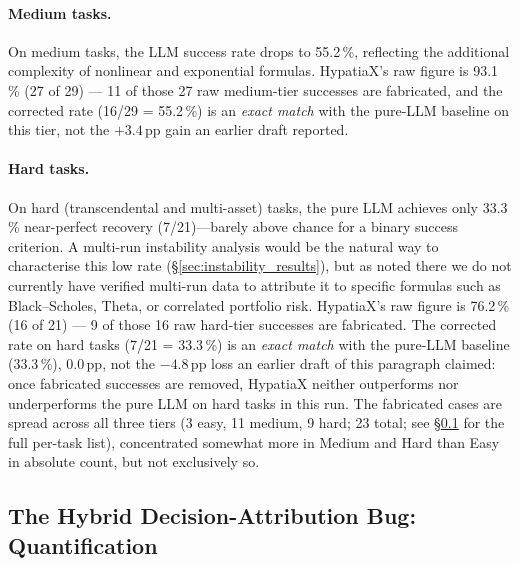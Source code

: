 \documentclass[twoside,11pt]{article}
\begin{document}
\paragraph{Medium tasks.}
On medium tasks, the LLM success rate drops to 55.2\,\%, reflecting the additional
complexity of nonlinear and exponential formulas. HypatiaX's raw figure is 93.1\,\%
(27 of 29) --- 11 of those 27 raw medium-tier successes are fabricated, and the
corrected rate (16/29 = 55.2\,\%) is an \emph{exact match} with the pure-LLM
baseline on this tier, not the $+3.4$\,pp gain an earlier draft reported.

\paragraph{Hard tasks.}
On hard (transcendental and multi-asset) tasks, the pure LLM achieves only 33.3\,\%
near-perfect recovery (7/21)---barely above chance for a binary success criterion. A
multi-run instability analysis would be the natural way to characterise this low
rate (\S\ref{sec:instability_results}), but as noted there we do not currently
have verified multi-run data to attribute it to specific formulas such as
Black--Scholes, Theta, or correlated portfolio risk. HypatiaX's raw figure is 76.2\,\%
(16 of 21) --- 9 of those 16 raw hard-tier successes are fabricated. The corrected rate on hard
tasks (7/21 = 33.3\,\%) is an \emph{exact match} with the pure-LLM baseline
(33.3\,\%), $0.0$\,pp, not the $-4.8$\,pp loss an earlier draft of this paragraph
claimed: once fabricated successes are removed, HypatiaX neither outperforms nor
underperforms the pure LLM on hard tasks in this run.
The fabricated cases are spread across all three tiers (3 easy, 11 medium, 9 hard;
23 total; see \S\ref{sec:hybrid-attribution-bug} for the full per-task list),
concentrated somewhat more in Medium and Hard than Easy in absolute count, but
not exclusively so.

\subsection{The Hybrid Decision-Attribution Bug: Quantification}
\label{sec:hybrid-attribution-bug}
\end{document}
